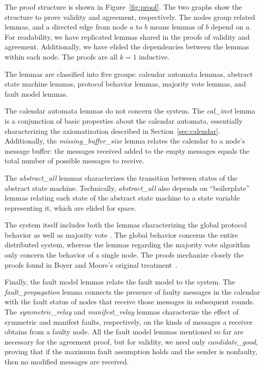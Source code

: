 \documentclass{llncs/llncs}
\newcommand{\lee}[1]{ } %
\newcommand{\lee}[1]{ {\color{blue}$<$lee: #1$>$} } %
\begin{document}
The proof structure is shown in Figure~\ref{fig:proof}. The two graphs show the structure to prove validity and agreement, respectively. The nodes group related lemmas, and a directed edge from node $a$ to $b$ means lemmas of $b$ depend on $a$. For readability, we have replicated lemmas shared in the proofs of validity and agreement. Additionally, we have elided the dependencies between the lemmas within each node. The proofs are all $k=1$ inductive.

The lemmas are classified into five groups: calendar automata lemmas, abstract state machine lemmas, protocol behavior lemmas, majority vote lemmas, and fault model lemmas.

The calendar automata lemmas do not concern the system. The \emph{cal\_invt} lemma is a conjunction of basic properties about the calendar automata, essentially characterizing the axiomatization described in Section~\ref{sec:calendar}. Additionally, the \emph{missing\_buffer\_size} lemma relates the calendar to a node's message buffer: the messages received added to the empty messages equals the total number of possible messages to receive.

The \emph{abstract\_all} lemmas characterizes the transition between states of the abstract state machine. Technically, \emph{abstract\_all} also depends on ``boilerplate'' lemmas relating each state of the abstract state machine to a state variable representing it, which are elided for space.

The system itself includes both the lemmas characterizing the global protocol behavior as well as majority vote\lee{have we talked about the voting algorithm earlier?}. The global behavior concerns the entire distributed system, whereas the lemmas regarding the majority vote algorithm only concern the behavior of a single node. The proofs mechanize closely the proofs found in Boyer and Moore's original treatment~\cite{}.

Finally, the fault model lemmas relate the fault model to the system. The \emph{fault\_propagation} lemma connects the presence of faulty messages in the calendar with the fault status of nodes that receive those messages in subsequent rounds. The \emph{symmetric\_relay} and \emph{manifest\_relay} lemmas characterize the effect of symmetric and manifest faults, respectively, on the kinds of messages a receiver obtains from a faulty node. All the fault model lemmas mentioned so far are necessary for the agreement proof, but for validity, we need only \emph{candidate\_good}, proving that if the maximum fault assumption holds and the sender is nonfaulty, then no modified messages are received.
\end{document}
